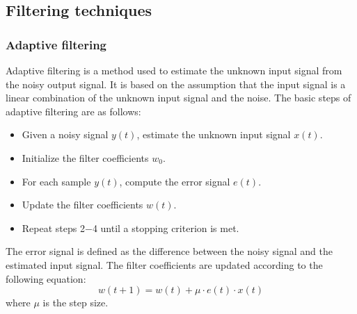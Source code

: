 \documentclass[a4paper]{sapthesis}
\begin{document}
\subsection{Filtering techniques}\label{sec:filtering}
\subsubsection{Adaptive filtering}
Adaptive filtering\cite{adaptive} is a method used to estimate the
unknown input signal from the noisy output signal. It is based on the
assumption that the input signal is a linear combination of the unknown
input signal and the noise. \newline
The basic steps of adaptive filtering are as follows:
\begin{itemize}
    \item Given a noisy signal $y(t)$, estimate the unknown input signal
    $x(t)$.
    \item Initialize the filter coefficients $w_0$.
    \item For each sample $y(t)$, compute the error signal $e(t)$.
    \item Update the filter coefficients $w(t)$.
    \item Repeat steps 2$-$4 until a stopping criterion is met.
    
\end{itemize}
The error signal is defined as the difference between the noisy signal
and the estimated input signal. The filter coefficients are updated
according to the following equation:
\begin{equation}
\label{eq:adaptive}
w(t+1) = w(t) + \mu \cdot e(t) \cdot x(t)
\end{equation}
where $\mu$ is the step size. \newline
\end{document}
